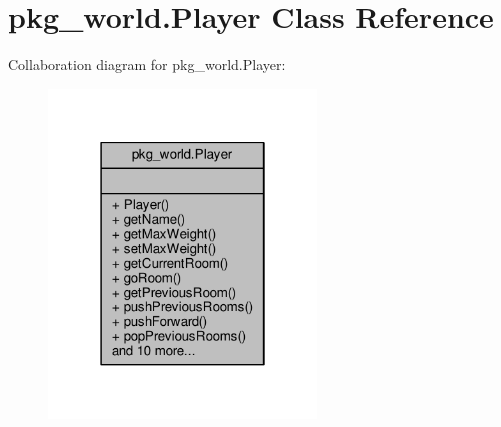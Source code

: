 \hypertarget{classpkg__world_1_1Player}{\section{pkg\-\_\-world.\-Player Class Reference}
\label{classpkg__world_1_1Player}
}


Collaboration diagram for pkg\-\_\-world.\-Player\-:
\nopagebreak
\begin{figure}[H]
\begin{center}
\leavevmode
\includegraphics[width=202pt]{classpkg__world_1_1Player__coll__graph}
\end{center}
\end{figure}

